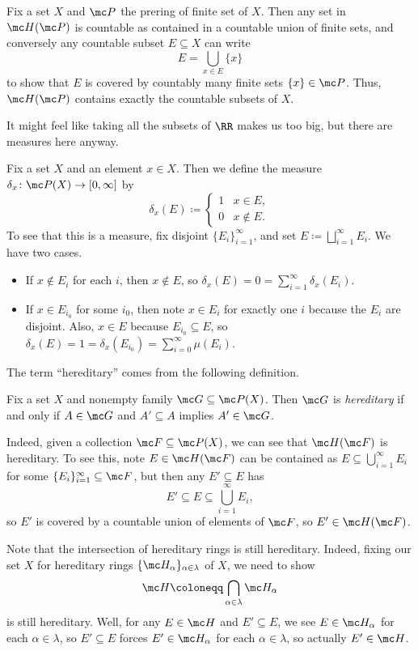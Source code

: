 \documentclass[../notes.tex]{subfiles}
\begin{document}
\begin{example}
	Fix a set $X$ and $\mc P$ the prering of finite set of $X$. Then any set in $\mc H(\mc P)$ is countable as contained in a countable union of finite sets, and conversely any countable subset $E\subseteq X$ can write
	\[E=\bigcup_{x\in E}\{x\}\]
	to show that $E$ is covered by countably many finite sets $\{x\}\in\mc P$. Thus, $\mc H(\mc P)$ contains exactly the countable subsets of $X$.
\end{example}
It might feel like taking all the subsets of $\RR$ makes us too big, but there are measures here anyway.
\begin{example}
	Fix a set $X$ and an element $x\in X$. Then we define the measure $\delta_x\colon\mc P(X)\to[0,\infty]$ by
	\[\delta_x(E)\coloneqq\begin{cases}
		1 & x\in E, \\
		0 & x\notin E.
	\end{cases}\]
	To see that this is a measure, fix disjoint $\{E_i\}_{i=1}^\infty$, and set $E\coloneqq\bigsqcup_{i=1}^\infty E_i$. We have two cases.
	\begin{itemize}
		\item If $x\notin E_i$ for each $i$, then $x\notin E$, so $\delta_x(E)=0=\sum_{i=1}^\infty\delta_x(E_i)$.
		\item If $x\in E_{i_0}$ for some $i_0$, then note $x\in E_i$ for exactly one $i$ because the $E_i$ are disjoint. Also, $x\in E$ because $E_{i_0}\subseteq E$, so $\delta_x(E)=1=\delta_x(E_{i_0})=\sum_{i=0}^\infty\mu(E_i)$.
	\end{itemize}
\end{example}
The term ``hereditary'' comes from the following definition.
\begin{definition}[Hereditary]
	Fix a set $X$ and nonempty family $\mc G\subseteq\mc P(X)$. Then $\mc G$ is \textit{hereditary} if and only if $A\in\mc G$ and $A'\subseteq A$ implies $A'\in\mc G$.
\end{definition}
\begin{ex} \label{ex:hf-is-hered}
	Indeed, given a collection $\mc F\subseteq\mc P(X)$, we can see that $\mc H(\mc F)$ is hereditary. To see this, note $E\in\mc H(\mc F)$ can be contained as $E\subseteq\bigcup_{i=1}^\infty E_i$ for some $\{E_i\}_{i=1}^\infty\subseteq\mc F$, but then any $E'\subseteq E$ has
	\[E'\subseteq E\subseteq\bigcup_{i=1}^\infty E_i,\]
	so $E'$ is covered by a countable union of elements of $\mc F$, so $E'\in\mc H(\mc F)$.
\end{ex}
\begin{remark} \label{rem:hered-intersections}
	Note that the intersection of hereditary rings is still hereditary. Indeed, fixing our set $X$ for hereditary rings $\{\mc H_\alpha\}_{\alpha\in\lambda}$ of $X$, we need to show
	\[\mc H\coloneqq\bigcap_{\alpha\in\lambda}\mc H_\alpha\]
	is still hereditary. Well, for any $E\in\mc H$ and $E'\subseteq E$, we see $E\in\mc H_\alpha$ for each $\alpha\in\lambda$, so $E'\subseteq E$ forces $E'\in\mc H_\alpha$ for each $\alpha\in\lambda$, so actually $E'\in\mc H$.
\end{remark}
\end{document}
